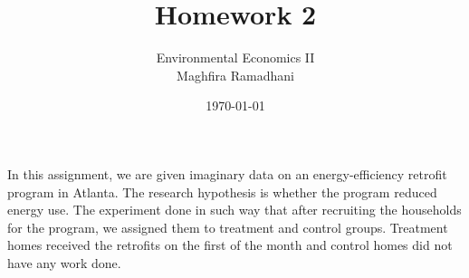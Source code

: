 \documentclass{article}
\begin{document}
 
\title{Homework 2}
\author{Environmental Economics II\\
Maghfira Ramadhani}
\date{\today}
\maketitle

In this assignment, we are given imaginary data on an energy-efficiency retrofit program in Atlanta. The research hypothesis is whether the program reduced energy use. The experiment done in such way that after recruiting the households for the program, we assigned them to treatment and control groups. Treatment homes received the retrofits on the first of the month and control homes did not have any work done.
\end{document}
